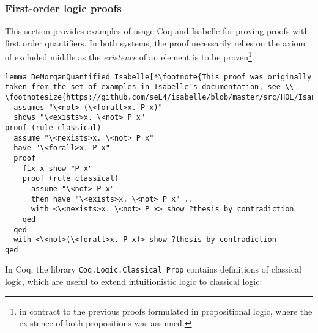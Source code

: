 \documentclass[article]{aaltoseries}
\begin{document}

\subsubsection{First-order logic proofs}

This section provides examples of usage Coq and Isabelle for proving proofs with first order quantifiers. In both systems, the proof necessarily relies on the axiom of excluded middle as the \textit{existence} of an element is to be proven\footnote{in contract to the previous proofs formulated in propositional logic, where the existence of both propositions was assumed.}.



\begin{lstlisting}[language=isabelle, caption={Proof of the de Morgan's law for first-order propositions in Isabelle}, label={ex_morgan_quant_isabelle}]
lemma DeMorganQuantified_Isabelle[*\footnote{This proof was originally taken from the set of examples in Isabelle's documentation, see \\ \footnotesize{https://github.com/seL4/isabelle/blob/master/src/HOL/Isar\_Examples/Drinker.thy}}*]:
  assumes "\<not> (\<forall>x. P x)"
  shows "\<exists>x. \<not> P x"
proof (rule classical)
  assume "\<nexists>x. \<not> P x"
  have "\<forall>x. P x"
  proof
    fix x show "P x"
    proof (rule classical)
      assume "\<not> P x"
      then have "\<exists>x. \<not> P x" ..
      with <\<nexists>x. \<not> P x> show ?thesis by contradiction
    qed
  qed
  with <\<not>(\<forall>x. P x)> show ?thesis by contradiction
qed
\end{lstlisting}





In Coq, the library \texttt{Coq.Logic.Classical\_Prop} contains definitions of classical logic, which are useful to extend intuitionistic logic to classical logic:
\end{document}
